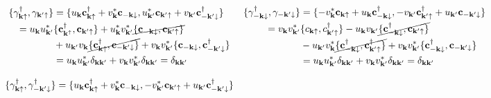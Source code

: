 \begin{equation*}
    \begin{array}{cc}
        \begin{split}
        \{{\gamma}_{{\bf k}\uparrow}^\dagger, {\gamma}_{{\bf k}'\uparrow} \} &= \{ u_{{\bf k}} {\bf c}_{{\bf k}\uparrow}^\dagger +  v_{{\bf k}}^* {\bf c}_{-{{\bf k}}\downarrow} , u_{{\bf k}'}^* {\bf c}_{{\bf k}'\uparrow} + v_{{\bf k}'} {\bf c}_{-{{\bf k}'}\downarrow}^\dagger\} \\
        = u_{{\bf k}} u_{{\bf k}'}^* &\{{\bf c}_{{\bf k}^\uparrow}^\dagger, {\bf c}_{{\bf k}' \uparrow}\} 
        + u_{{\bf k}}^* v_{{\bf k}'}^* \cancel{\{{\bf c}_{-{\bf k}\downarrow}, {\bf c}_{{\bf k}'\uparrow}\}} \\
        &+ u_{{\bf k}'} v_{{\bf k}} \cancel{\{{\bf c}_{{\bf k} \uparrow}^\dagger, {\bf c}_{-{\bf k}'\downarrow}\}} 
        + v_{{\bf k}} v_{{\bf k}'}^* \{{\bf c}_{-{\bf k} \downarrow}, {\bf c}_{-{\bf k}' \downarrow}^\dagger\}
        \\
        &= u_{{\bf k}} u_{{\bf k}'}^* \delta_{{\bf k}{\bf k}'} +  v_{{\bf k}} v_{{\bf k}'}^* \delta_{{\bf k}{\bf k}'}= \delta_{{\bf k}{\bf k}'}
        \end{split} & \begin{split}
        \{{\gamma}_{-{\bf k}\downarrow}^\dagger, {\gamma}_{-{\bf k}'\downarrow} \} &= \{-v_{{\bf k}}^* {\bf c}_{{\bf k}\uparrow} + u_{{\bf k}} {\bf c}_{-{{\bf k}}\downarrow}^\dagger, -v_{{\bf k}'} {\bf c}_{{\bf k}'\uparrow}^\dagger + u_{{\bf k}'} {\bf c}_{-{{\bf k}'}\downarrow}\}\\
        = v_{{\bf k}} v_{{\bf k}'}^* &\{c_{{\bf k}\uparrow}, c_{{\bf k}'\uparrow}^\dagger\} - u_{{\bf k}} v_{{\bf k}'} \cancel{\{{\bf c}_{-{\bf k}\downarrow}^\dagger, {\bf c}_{{\bf k}'\uparrow} \}} \\
        &- u_{{\bf k}'} v_{{\bf k}}^* \cancel{\{{\bf c}_{-{\bf k} \downarrow}^\dagger, {\bf c}_{{\bf k}' \uparrow}^\dagger\} } + v_{{\bf k}} v_{{\bf k}'}^* \{{\bf c}_{-{\bf k} \downarrow}^\dagger, {\bf c}_{-{\bf k}' \downarrow}\} \\
        &= u_{{\bf k}} u_{{\bf k}'}^* \delta_{{\bf k}{\bf k}'} +  v_{{\bf k}} v_{{\bf k}'}^* \delta_{{\bf k}{\bf k}'}= \delta_{{\bf k}{\bf k}'}
        \end{split} \\
        \\
        \begin{split}
        \{{\gamma}_{{\bf k}\uparrow}^\dagger, {\gamma}_{-{\bf k}'\downarrow}^\dagger\} &= \{u_{{\bf k}} {\bf c}_{{\bf k}\uparrow}^\dagger + v_{{\bf k}}^* {\bf c}_{-{{\bf k}}\downarrow}, -v_{{\bf k}'}^* {\bf c}_{{\bf k}'\uparrow} + u_{{\bf k}'} {\bf c}_{-{{\bf k}'}\downarrow}^\dagger\} \\

\end{split}
\end{array}
\end{equation*}
